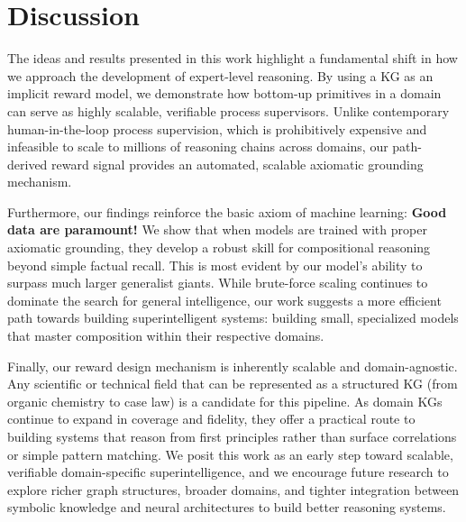\documentclass{article}
\theoremstyle{plain}
\theoremstyle{definition}
\theoremstyle{remark}
\begin{document}
\section{Discussion}

The ideas and results presented in this work highlight a fundamental shift in how we approach the development of expert-level reasoning. By using a KG as an implicit reward model, we demonstrate how bottom-up primitives in a domain can serve as highly scalable, verifiable process supervisors. Unlike contemporary human-in-the-loop process supervision, which is prohibitively expensive and infeasible to scale to millions of reasoning chains across domains, our path-derived reward signal provides an automated, scalable axiomatic grounding mechanism. 

Furthermore, our findings reinforce the basic axiom of machine learning: \textbf{Good data are paramount!} We show that when models are trained with proper axiomatic grounding, they develop a robust skill for compositional reasoning beyond simple factual recall. This is most evident by our model's ability to surpass much larger generalist giants. While brute-force scaling continues to dominate the search for general intelligence, our work suggests a more efficient path towards building superintelligent systems: building small, specialized models that master composition within their respective domains.

Finally, our reward design mechanism is inherently scalable and domain-agnostic. Any scientific or technical field that can be represented as a structured KG (from organic chemistry to case law) is a candidate for this pipeline. As domain KGs continue to expand in coverage and fidelity, they offer a practical route to building systems that reason from first principles rather than surface correlations or simple pattern matching. We posit this work as an early step toward scalable, verifiable domain-specific superintelligence, and we encourage future research to explore richer graph structures, broader domains, and tighter integration between symbolic knowledge and neural architectures to build better reasoning systems.
\end{document}
